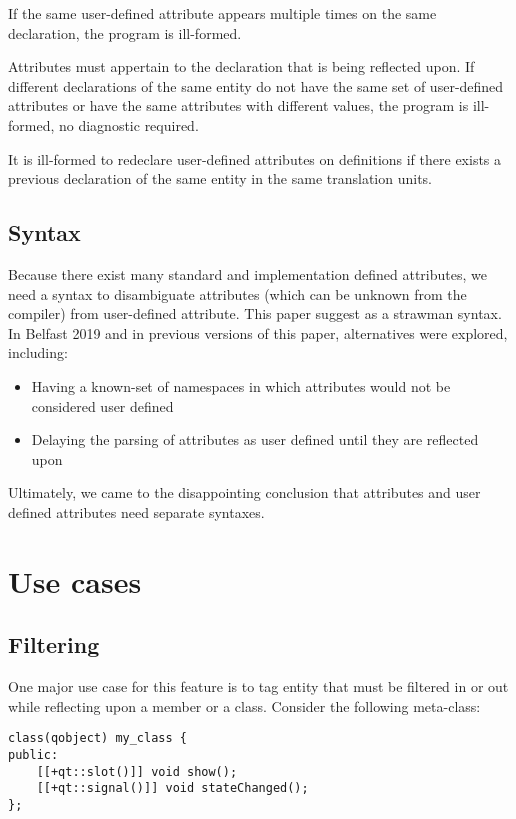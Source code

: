 \documentclass{wg21}
\begin{document}
If the same user-defined attribute appears multiple times on the same declaration, the program is ill-formed.

Attributes must appertain to the declaration that is being reflected upon.
If different declarations of the same entity do not have the same set of user-defined attributes or have the same attributes with different values, the program is ill-formed, no diagnostic required.

It is ill-formed to redeclare user-defined attributes on definitions if there exists a previous declaration of the same entity
in the same translation units.

\subsection{Syntax}

Because there exist many standard and implementation defined attributes, we need a syntax to disambiguate attributes (which can be unknown from the compiler)
from user-defined attribute.
This paper suggest  as a strawman syntax.
In Belfast 2019 and in previous versions of this paper, alternatives were explored, including:

\begin{itemize}
\item Having a known-set of namespaces in which attributes would not be considered user defined
\item Delaying the parsing of attributes as user defined until they are reflected upon
\end{itemize}

Ultimately, we came to the disappointing conclusion that attributes and user defined attributes need separate syntaxes. 

\section{Use cases}

\subsection{Filtering}

One major use case for this feature is to tag entity that must be filtered in or out while reflecting upon a member or a class.
Consider the following meta-class:

\begin{verbatim}
class(qobject) my_class {
public:
    [[+qt::slot()]] void show();
    [[+qt::signal()]] void stateChanged();
};

\end{verbatim}
\end{document}
